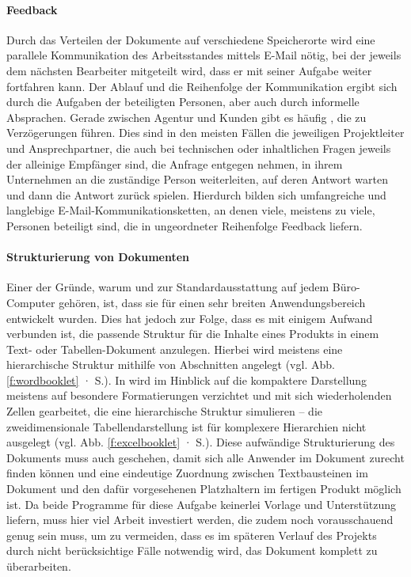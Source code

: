 \paragraph{Feedback} Durch das Verteilen der Dokumente auf verschiedene Speicherorte wird eine parallele Kommunikation des Arbeitsstandes mittels E-Mail nötig, bei der jeweils dem nächsten Bearbeiter mitgeteilt wird, dass er mit seiner Aufgabe weiter fortfahren kann. Der Ablauf und die Reihenfolge der Kommunikation ergibt sich durch die Aufgaben der beteiligten Personen, aber auch durch informelle Absprachen. Gerade zwischen Agentur und Kunden gibt es häufig , die zu Verzögerungen führen. Dies sind in den meisten Fällen die jeweiligen Projektleiter und Ansprechpartner, die auch bei technischen oder inhaltlichen Fragen jeweils der alleinige Empfänger sind, die Anfrage entgegen nehmen, in ihrem Unternehmen an die zuständige Person weiterleiten, auf deren Antwort warten und dann die Antwort zurück spielen. Hierdurch bilden sich umfangreiche und langlebige E-Mail-Kommunikationsketten, an denen viele, meistens zu viele, Personen beteiligt sind, die in ungeordneter Reihenfolge Feedback liefern.

\paragraph{Strukturierung von Dokumenten} Einer der Gründe, warum  und  zur Standardausstattung auf jedem Büro-Computer gehören, ist, dass sie für einen sehr breiten Anwendungsbereich entwickelt wurden. Dies hat jedoch zur Folge, dass es mit einigem Aufwand verbunden ist, die passende Struktur für die Inhalte eines Produkts in einem Text- oder Tabellen-Dokument anzulegen. Hierbei wird meistens eine hierarchische Struktur mithilfe von Abschnitten angelegt (vgl. Abb. \ref{f:wordbooklet} · S.\pageref{f:wordbooklet}). In  wird im Hinblick auf die kompaktere Darstellung meistens auf besondere Formatierungen verzichtet und mit sich wiederholenden Zellen gearbeitet, die eine hierarchische Struktur simulieren -- die zweidimensionale Tabellendarstellung ist für komplexere Hierarchien nicht ausgelegt (vgl. Abb. \ref{f:excelbooklet} · S.\pageref{f:excelbooklet}). Diese aufwändige Strukturierung des Dokuments muss auch geschehen, damit sich alle Anwender im Dokument zurecht finden können und eine eindeutige Zuordnung zwischen Textbausteinen im Dokument und den dafür vorgesehenen Platzhaltern im fertigen Produkt möglich ist. Da beide Programme für diese Aufgabe keinerlei Vorlage und Unterstützung liefern, muss hier viel Arbeit investiert werden, die zudem noch vorausschauend genug sein muss, um zu vermeiden, dass es im späteren Verlauf des Projekts durch nicht berücksichtige Fälle notwendig wird, das Dokument komplett zu überarbeiten.

